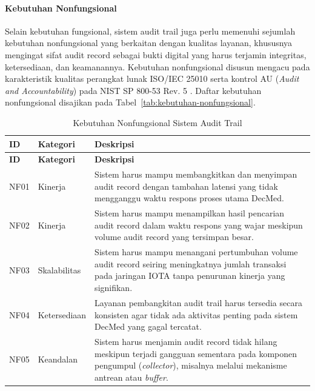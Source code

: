 \paragraph{Kebutuhan Nonfungsional}

Selain kebutuhan fungsional, sistem audit trail juga perlu memenuhi sejumlah kebutuhan nonfungsional yang berkaitan dengan kualitas layanan, khususnya mengingat sifat audit record sebagai bukti digital yang harus terjamin integritas, ketersediaan, dan keamanannya. Kebutuhan nonfungsional disusun mengacu pada karakteristik kualitas perangkat lunak ISO/IEC 25010 serta kontrol AU (\textit{Audit and Accountability}) pada NIST SP 800-53 Rev. 5 \cite{NIST80053}. Daftar kebutuhan nonfungsional disajikan pada Tabel~\ref{tab:kebutuhan-nonfungsional}.

\begin{xltabular}{\textwidth}{|>{\centering\arraybackslash}p{1.4cm}|>{\raggedright\arraybackslash}p{2.6cm}|X|}
    \caption{Kebutuhan Nonfungsional Sistem Audit Trail} \\
    \hline
    \textbf{ID} & \textbf{Kategori} & \textbf{Deskripsi} \\
    \hline
    \endfirsthead
    \hline
    \textbf{ID} & \textbf{Kategori} & \textbf{Deskripsi} \\
    \hline
    \endhead
    \hline
    \endfoot
    \hline
    \endlastfoot

    NF01 & Kinerja & Sistem harus mampu membangkitkan dan menyimpan audit record dengan tambahan latensi yang tidak mengganggu waktu respons proses utama DecMed. \\
    \hline

    NF02 & Kinerja & Sistem harus mampu menampilkan hasil pencarian audit record dalam waktu respons yang wajar meskipun volume audit record yang tersimpan besar. \\
    \hline

    NF03 & Skalabilitas & Sistem harus mampu menangani pertumbuhan volume audit record seiring meningkatnya jumlah transaksi pada jaringan IOTA tanpa penurunan kinerja yang signifikan. \\
    \hline

    NF04 & Ketersediaan & Layanan pembangkitan audit trail harus tersedia secara konsisten agar tidak ada aktivitas penting pada sistem DecMed yang gagal tercatat. \\
    \hline

    NF05 & Keandalan & Sistem harus menjamin audit record tidak hilang meskipun terjadi gangguan sementara pada komponen pengumpul (\textit{collector}), misalnya melalui mekanisme antrean atau \textit{buffer}. \\
    \hline


\end{xltabular}
